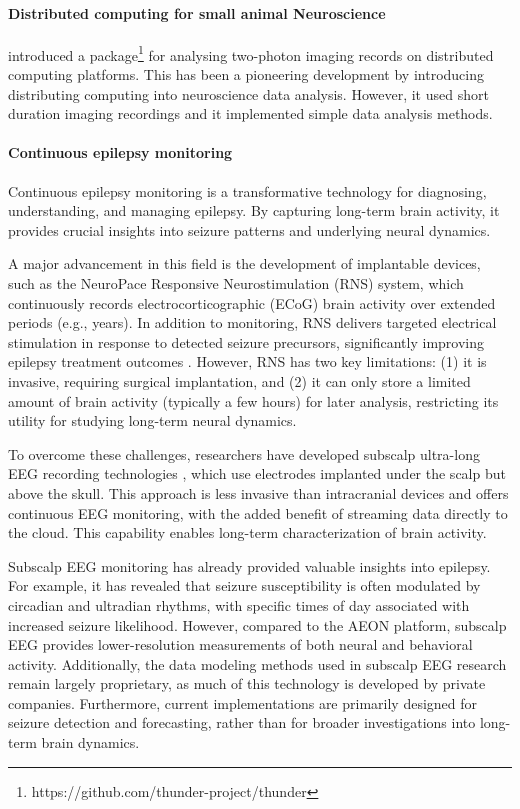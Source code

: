 \documentclass[12pt]{article}
\begin{document}
\paragraph{Distributed computing for small animal Neuroscience}
%
\citet{freemanEtAl14} introduced a
package\footnote{https://github.com/thunder-project/thunder} for analysing
two-photon imaging records on distributed computing platforms.  This has been a
pioneering development by introducing distributing computing into neuroscience
data analysis. However, it used short duration imaging recordings and it
implemented simple data analysis methods.

\paragraph{Continuous epilepsy monitoring}
%
Continuous epilepsy monitoring is a transformative technology for diagnosing,
understanding, and managing epilepsy. By capturing long-term brain activity, it
provides crucial insights into seizure patterns and underlying neural dynamics.

A major advancement in this field is the development of implantable devices,
such as the NeuroPace Responsive Neurostimulation (RNS) system, which
continuously records electrocorticographic (ECoG) brain activity over extended
periods (e.g., years). In addition to monitoring, RNS delivers targeted
electrical stimulation in response to detected seizure precursors,
significantly improving epilepsy treatment outcomes \citep{rao21}. However, RNS
has two key limitations: (1) it is invasive, requiring surgical implantation,
and (2) it can only store a limited amount of brain activity (typically a few
hours) for later analysis, restricting its utility for studying long-term
neural dynamics.

To overcome these challenges, researchers have developed subscalp ultra-long
EEG recording technologies \citep{duunHenriksenEtAl20}, which use electrodes
implanted under the scalp but above the skull. This approach is less invasive
than intracranial devices and offers continuous EEG monitoring, with the added
benefit of streaming data directly to the cloud. This capability enables
long-term characterization of brain activity.

Subscalp EEG monitoring has already provided valuable insights into epilepsy.
For example, it has revealed that seizure susceptibility is often modulated by
circadian and ultradian rhythms, with specific times of day associated with
increased seizure likelihood. However, compared to the AEON platform, subscalp
EEG provides lower-resolution measurements of both neural and behavioral
activity. Additionally, the data modeling methods used in subscalp EEG research
remain largely proprietary, as much of this technology is developed by private
companies. Furthermore, current implementations are primarily designed for
seizure detection and forecasting, rather than for broader investigations into
long-term brain dynamics.
\end{document}
